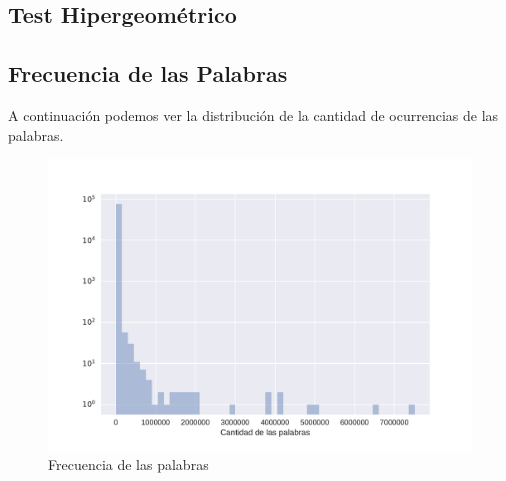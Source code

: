 
%



\subsection{Test Hipergeométrico}




\subsection{Frecuencia de las Palabras}
\label{sub: frecuenciaPalabras}
A continuación podemos ver la distribución de la cantidad de ocurrencias de las palabras.
\begin{figure}[ht]
\centering
\includegraphics[scale=0.6]{./images/DistribucionOcurrenciasPalabras.pdf} 
\caption{Frecuencia de las palabras} 
\label{fig:cantPalabras} 
\end{figure}

